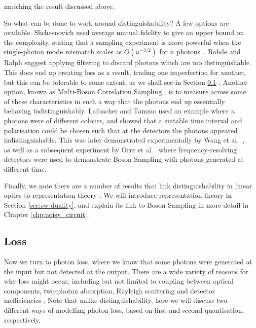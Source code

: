 \noindent matching the result discussed above.

So what can be done to work around distinguishability? A few options are available. Shchesnovich used average mutual fidelity to give an upper bound on the complexity, stating that a sampling experiment is more powerful when the single-photon mode mismatch scales as $O(n^{-3/2})$ for $n$ photons~\cite{shchesnovich2014}. Rohde and Ralph \cite{rohde2012} suggest applying filtering to discard photons which are too distinguishable. This does end up creating loss as a result, trading one imperfection for another, but this can be tolerable to some extent, as we shall see in Section \ref{ssec:imperfections-loss} \cite{rohde2012, aaronson2016}. Another option, known as Multi-Boson Correlation Sampling \cite{tamma2014, tamma2015, laibacher2015, tamma2016, laibacher2017}, is to measure across some of these characteristics in such a way that the photons end up essentially behaving indistinguishably. Laibacher and Tamma used an example where $n$ photons were of different colours, and showed that a suitable time interval and polarisation could be chosen such that at the detectors the photons appeared indistinguishable. This was later demonstrated experimentally by Wang et al.~\cite{wang2018timebin}, as well as a subsequent experiment by Orre et al.~\cite{orre2019} where frequency-resolving detectors were used to demonstrate Boson Sampling with photons generated at different time.

Finally, we note there are a number of results that link distinguishability in linear optics to representation theory \cite{adamson2008, deguise2014, turner2016, menssen2017, stanisic2018}. We will introduce representation theory in Section \ref{sec:sw-duality}, and explain its link to Boson Sampling in more detail in Chapter \ref{chp:noisy_circuit}.

\subsection{Loss}
\label{ssec:imperfections-loss}

Now we turn to photon loss, where we know that some photons were generated at the input but not detected at the output. There are a wide variety of reasons for why loss might occur, including but not limited to coupling between optical components, two-photon absorption, Rayleigh scattering and detector inefficiencies \cite{silverstone2016, rosenfeld2019}. Note that unlike distinguishability, here we will discuss two different ways of modelling photon loss, based on first and second quantisation, respectively.

